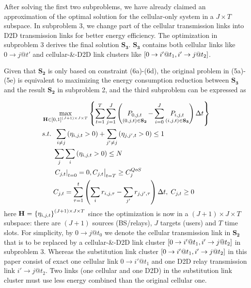\documentclass{ieeeaccess}
\begin{document}
After solving the first two subproblems, we have already claimed an approximation of the optimal solution for the cellular-only system in a $J \times T$ subspace. In subproblem 3, we change part of the cellular transmission links into D2D transmission links for better energy efficiency. The optimization in subproblem 3 derives the final solution ${{\mathbf{S}}_{\mathbf{3}}}$. ${{\mathbf{S}}_{\mathbf{3}}}$ contains both cellular links like $0 \to j@t'$ and cellular-\&-D2D link clusters like $\left[ {{\rm{0}} \to i'@{t_1},i' \to j@{t_2}} \right]$.

Given that ${{\mathbf{S}}_{\mathbf{2}}}$ is only based on constraint (6a)-(6d), the original problem in (5a)-(5e) is equivalent to maximizing the energy consumption reduction between ${{\mathbf{S}}_{\mathbf{3}}}$ and the result ${{\mathbf{S}}_{\mathbf{2}}}$ in subproblem 2, and the third subproblem can be expressed as

\begin{subequations}
\begin{align}
& \mathop {\max }\limits_{{\mathbf{{\rm H}}} \in {{\left[ {0,1} \right]}^{\left( {J + 1} \right) \times J \times T}}} \left\{ {\sum\limits_{t = 1}^T {\sum\limits_{j = 1}^J {\left( {\mathop {{P_{0,j,t}}}\limits_{\left( {0,j,t} \right) \in {{\mathbf{S}}_{\mathbf{2}}}}  - \sum\limits_{i = 0}^J {\mathop {{P_{i,j,t}}}\limits_{\left( {i,j,t} \right) \in {{\mathbf{S}}_{\mathbf{3}}}} } } \right)\Delta t} } } \right\} \\
& {s.t.} \;\; \sum\limits_{i \ne j} {\left( {{\eta _{i,j,t}} > 0} \right)}  + \sum\limits_{j' \ne j} {\left( {{\eta _{j,j',t}} > 0} \right) \le {\text{1}}} \\
& \;\;\;\;\;\; \sum\limits_j {\sum\limits_i {\left( {{\eta _{i,j,t}} > 0} \right)} }  \le N \\
& \;\;\;\;\;\; {\left. {{{\left. {{C_{j,t}}} \right|}_{t = 0}} = 0, {C_{j,t}}} \right|_{t = T}} \ge C_j^{QoS} \\
& \;\;\;\;\;\; {C_{j,t}} = \sum\limits_{\tau  = 1}^t {\left( {\sum\limits_i {{r_{i,j,\tau }}}  - \sum\limits_{j'} {{r_{j,j',\tau }}} } \right)\Delta t} ,\; {C_{j,t}} \ge 0
\end{align}
\end{subequations}
here ${\mathbf{{\rm H}}}{\text{ = }}{\left\{ {{\eta _{i,j,t}}} \right\}^{\left( {J + 1} \right) \times J \times T}}$ since the optimization is now in a $\left( {J + 1} \right) \times J \times T$ subspace: there are $\left( {J + 1} \right)$ sources (BS/relays), $J$ targets (users) and $T$ time slots. For simplicity, by $0 \to j@{t_0}$ we denote the cellular transmission link in ${{\mathbf{S}}_{\mathbf{2}}}$ that is to be replaced by a cellular-\&-D2D link cluster $\left[ {{\rm{0}} \to i'@{t_1},i' \to j@{t_2}} \right]$ in subproblem 3. Whereas the substitution link cluster $\left[ {{\rm{0}} \to i'@{t_1},i' \to j@{t_2}} \right]$ in this paper consist of exact one cellular link $0 \to i'@{t_1}$ and one D2D relay transmission link $i' \to j@{t_2}$. Two links (one cellular and one D2D) in the substitution link cluster must use less energy combined than the original cellular one.
\end{document}
